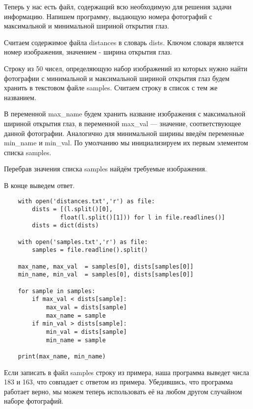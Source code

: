 Теперь у нас есть файл, содержащий всю необходимую для решения задачи информацию. Напишем программу, выдающую номера фотографий с максимальной и минимальной шириной открытия глаз.

Считаем содержимое файла distances в словарь dists. Ключом словаря является номер изображения, значением - ширина открытия глаз.

Строку из 50 чисел, определяющую набор изображений из которых нужно найти фотографии с минимальной и максимальной шириной открытия глаз будем хранить в текстовом файле samples. Считаем строку в список с тем же названием.

В переменной max\_name будем хранить название изображения с максимальной шириной открытия глаз, в переменной max\_val — значение, соответствующее данной фотографии. Аналогично для минимальной ширины введём переменные min\_name и min\_val. По умолчанию мы инициализируем их первым элементом списка samples.

Перебрав значения списка samples найдём требуемые изображения.

В конце выведем ответ.

\begin{verbatim}
    with open('distances.txt','r') as file:
        dists = [(l.split()[0],
                float(l.split()[1])) for l in file.readlines()]
        dists = dict(dists)

    with open('samples.txt','r') as file:
        samples = file.readline().split()

    max_name, max_val  = samples[0], dists[samples[0]]
    min_name, min_val  = samples[0], dists[samples[0]]

    for sample in samples:
        if max_val < dists[sample]:
            max_val = dists[sample]
            max_name = sample
        if min_val > dists[sample]:
            min_val = dists[sample]
            min_name = sample
            
    print(max_name, min_name)
\end{verbatim}

Если записать в файл samples строку из примера, наша программа выведет числа 183 и 163, что совпадает с ответом из примера. Убедившись, что программа работает верно, мы можем теперь использовать её на любом другом случайном наборе фотографий.
